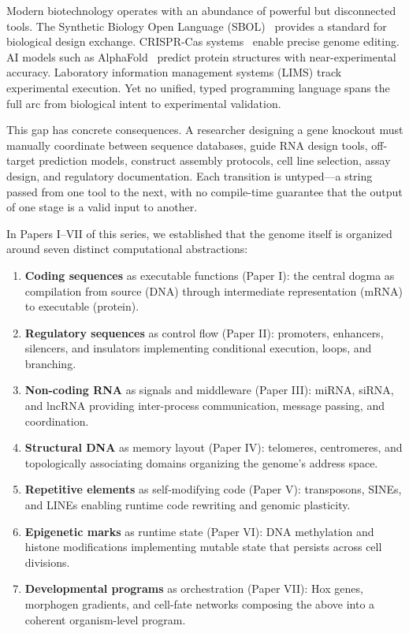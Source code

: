 \documentclass[12pt,a4paper]{article}
\begin{document}
Modern biotechnology operates with an abundance of powerful but disconnected tools. The Synthetic Biology Open Language (SBOL)~\cite{galdzicki2014sbol} provides a standard for biological design exchange. CRISPR-Cas systems~\cite{doudna2014crispr} enable precise genome editing. AI models such as AlphaFold~\cite{jumper2021alphafold} predict protein structures with near-experimental accuracy. Laboratory information management systems (LIMS) track experimental execution. Yet no unified, typed programming language spans the full arc from biological intent to experimental validation.

This gap has concrete consequences. A researcher designing a gene knockout must manually coordinate between sequence databases, guide RNA design tools, off-target prediction models, construct assembly protocols, cell line selection, assay design, and regulatory documentation. Each transition is untyped---a string passed from one tool to the next, with no compile-time guarantee that the output of one stage is a valid input to another.

In Papers I--VII of this series, we established that the genome itself is organized around seven distinct computational abstractions:

\begin{enumerate}[label=(\roman*)]
    \item \textbf{Coding sequences} as executable functions (Paper I): the central dogma as compilation from source (DNA) through intermediate representation (mRNA) to executable (protein).
    \item \textbf{Regulatory sequences} as control flow (Paper II): promoters, enhancers, silencers, and insulators implementing conditional execution, loops, and branching.
    \item \textbf{Non-coding RNA} as signals and middleware (Paper III): miRNA, siRNA, and lncRNA providing inter-process communication, message passing, and coordination.
    \item \textbf{Structural DNA} as memory layout (Paper IV): telomeres, centromeres, and topologically associating domains organizing the genome's address space.
    \item \textbf{Repetitive elements} as self-modifying code (Paper V): transposons, SINEs, and LINEs enabling runtime code rewriting and genomic plasticity.
    \item \textbf{Epigenetic marks} as runtime state (Paper VI): DNA methylation and histone modifications implementing mutable state that persists across cell divisions.
    \item \textbf{Developmental programs} as orchestration (Paper VII): Hox genes, morphogen gradients, and cell-fate networks composing the above into a coherent organism-level program.
\end{enumerate}
\end{document}
